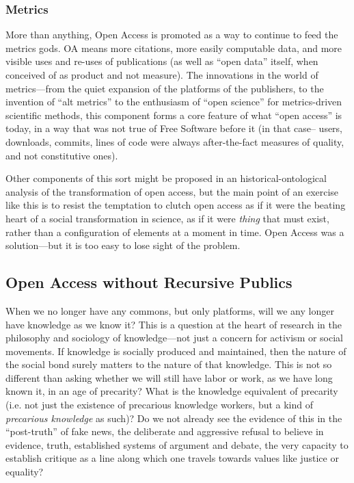 \documentclass[11pt]{article}
\begin{document}
\subsubsection*{\textbf{Metrics}}
\label{sec:org23ae73d}
More than anything, Open Access is promoted as a way to continue to feed the metrics gods.  OA means more citations, more easily computable data, and more visible uses and re-uses of publications (as well as ``open data'' itself, when conceived of as product and not measure).  The innovations in the world of metrics---from the quiet expansion of the platforms of the publishers, to the invention of ``alt metrics'' to the enthusiasm of ``open science'' for metrics-driven scientific methods, this component forms a core feature of what ``open access'' is today, in a way that was not true of Free Software before it (in that case-- users, downloads, commits, lines of code were always after-the-fact measures of quality, and not constitutive ones).  

Other components of this sort might be proposed in an historical-ontological analysis of the transformation of open access, but the main point of an exercise like this is to resist the temptation to clutch open access as if it were the beating heart of a social transformation in science, as if it were  \emph{thing} that must exist, rather than a configuration of elements at a moment in time.  Open Access was a solution---but it is too easy to lose sight of the problem. 

\subsection*{Open Access without Recursive Publics}
\label{sec:orgf11f1a0}

When we no longer have any commons, but only platforms, will we any longer have knowledge as we know it?  This is a question at the heart of research in the philosophy and sociology of knowledge---not just a concern for activism or social movements.  If knowledge is socially produced and maintained, then the nature of the social bond surely matters to the nature of that knowledge.   This is not so different than asking whether we  will still have labor or work, as we have long known it, in an age of precarity?  What is the knowledge equivalent of precarity (i.e. not just the existence of precarious knowledge workers, but a kind of \emph{precarious knowledge} as such)?  Do we not already see the evidence of this in the ``post-truth'' of fake news, the deliberate and aggressive refusal to believe in evidence, truth, established systems of argument and debate, the very capacity to establish critique as a line along which one travels towards values like justice or equality?
\end{document}
